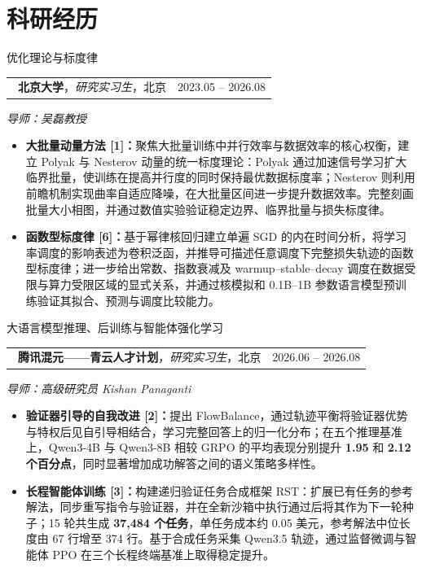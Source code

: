 \documentclass[a4paper,9pt]{extarticle}
\makeatletter
\newcommand{\datedentry}[2]{%
\begin{tabularx}{\linewidth}{@{}X r@{}}
#1 & #2
\end{tabularx}}
\makeatother
\begin{document}
\section{科研经历}
\noindent\textsf{优化理论与标度律}\par
\vspace{-2pt}
\datedentry{\faCaretRight\ \textcolor{experienceblue}{\textbf{北京大学}}，\textit{研究实习生}，北京}{2023.05 -- 2026.08}
\vspace{-3pt}
\hspace{1em}\textit{导师：吴磊教授}
\begin{itemize}\setlength\itemsep{1pt}\setlength\topsep{2pt}\setlength\parsep{0pt}\setlength\parskip{0pt}\small
  \item \textbf{大批量动量方法 [1]：}聚焦大批量训练中并行效率与数据效率的核心权衡，建立 Polyak 与 Nesterov 动量的统一标度理论：Polyak 通过加速信号学习扩大临界批量，使训练在提高并行度的同时保持最优数据标度率；Nesterov 则利用前瞻机制实现曲率自适应降噪，在大批量区间进一步提升数据效率。完整刻画批量大小相图，并通过数值实验验证稳定边界、临界批量与损失标度律。
  \item \textbf{函数型标度律 [6]：}基于幂律核回归建立单遍 SGD 的内在时间分析，将学习率调度的影响表述为卷积泛函，并推导可描述任意调度下完整损失轨迹的函数型标度律；进一步给出常数、指数衰减及 warmup--stable--decay 调度在数据受限与算力受限区域的显式关系，并通过核模拟和 0.1B--1B 参数语言模型预训练验证其拟合、预测与调度比较能力。
\end{itemize}
\vspace{-3pt}

\noindent\textsf{大语言模型推理、后训练与智能体强化学习}\par
\vspace{-2pt}
\datedentry{\faCaretRight\ \textcolor{experienceblue}{\textbf{腾讯混元——青云人才计划}}，\textit{研究实习生}，北京}{2026.06 -- 2026.08}
\vspace{-3pt}
\hspace{1em}\textit{导师：高级研究员 Kishan Panaganti}
\begin{itemize}\setlength\itemsep{1pt}\setlength\topsep{2pt}\setlength\parsep{0pt}\setlength\parskip{0pt}\small
  \item \textbf{验证器引导的自我改进 [2]：}提出 FlowBalance，通过轨迹平衡将验证器优势与特权后见自引导相结合，学习完整回答上的归一化分布；在五个推理基准上，Qwen3-4B 与 Qwen3-8B 相较 GRPO 的平均表现分别提升 \textbf{1.95} 和 \textbf{2.12 个百分点}，同时显著增加成功解答之间的语义策略多样性。
  \item \textbf{长程智能体训练 [3]：}构建递归验证任务合成框架 RST：扩展已有任务的参考解法，同步重写指令与验证器，并在全新沙箱中执行通过后将其作为下一轮种子；15 轮共生成 \textbf{37,484 个任务}，单任务成本约 0.05 美元，参考解法中位长度由 67 行增至 374 行。基于合成任务采集 Qwen3.5 轨迹，通过监督微调与智能体 PPO 在三个长程终端基准上取得稳定提升。
\end{itemize}
\vspace{-3pt}
\end{document}
